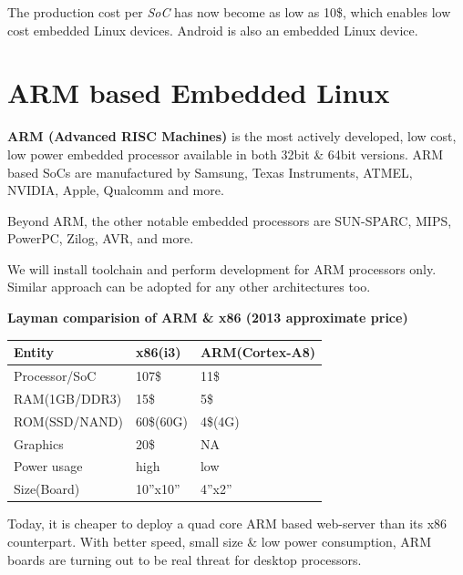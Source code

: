 \documentclass[letterpaper,10pt,english]{sphinxmanual}
\begin{document}
The production cost per \emph{SoC} has now become as low as 10\$, which enables low
cost embedded Linux devices. Android is also an embedded Linux device.


\section{ARM based Embedded Linux}
\label{embedded-linux:arm-based-embedded-linux}
\textbf{ARM (Advanced RISC Machines)} is the most actively developed, low cost, low
power embedded processor available in both 32bit \& 64bit versions. ARM based
SoCs are manufactured by Samsung, Texas Instruments, ATMEL, NVIDIA, Apple,
Qualcomm and more.

Beyond ARM, the other notable embedded processors are SUN-SPARC, MIPS, PowerPC,
Zilog, AVR, and more.

We will install toolchain and perform development for ARM processors only.
Similar approach can be adopted for any other architectures too.

\begin{DUlineblock}{0em}
\item[] 
\end{DUlineblock}

\textbf{Layman comparision of ARM \& x86 (2013 approximate price)}

\begin{tabulary}{\linewidth}{|L|L|L|}
\hline
\textbf{
Entity
} & \textbf{
x86(i3)
} & \textbf{
ARM(Cortex-A8)
}\\\hline

Processor/SoC
 & 
107\$
 & 
11\$
\\\hline

RAM(1GB/DDR3)
 & 
15\$
 & 
5\$
\\\hline

ROM(SSD/NAND)
 & 
60\$(60G)
 & 
4\$(4G)
\\\hline

Graphics
 & 
20\$
 & 
NA
\\\hline

Power usage
 & 
high
 & 
low
\\\hline

Size(Board)
 & 
10''x10''
 & 
4''x2''
\\\hline
\end{tabulary}


Today, it is cheaper to deploy a quad core ARM based web-server than its x86
counterpart. With better speed, small size  \& low power consumption, ARM boards
are turning out to be real threat for desktop processors.
\end{document}
